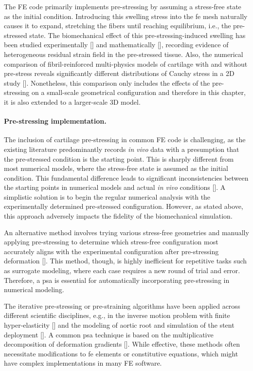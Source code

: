 The FE code primarily implements pre-stressing by assuming a stress-free state as the initial condition. Introducing this swelling stress into the \ac{fe} mesh naturally causes it to expand, stretching the fibers until reaching equilibrium, i.e., the pre-stressed state. The biomechanical effect of this pre-stressing-induced swelling has been studied experimentally [\cite{narmoneva1999}] and mathematically [\cite{setton1996}], recording evidence of heterogeneous residual strain field in the pre-stressed tissue. Also, the numerical comparison of fibril-reinforced multi-physics models of cartilage with and without pre-stress reveals significantly different distributions of Cauchy stress in a 2D study [\cite{wang2018}]. Nonetheless, this comparison only includes the effects of the pre-stressing on a small-scale geometrical configuration and therefore in this chapter, it is also extended to a larger-scale 3D model.

\paragraph{Pre-stressing implementation.} The inclusion of cartilage pre-stressing in common FE code is challenging, as the existing literature predominantly records \textit{in vivo} data with a presumption that the pre-stressed condition is the starting point. This is sharply different from most numerical models, where the stress-free state is assumed as the initial condition. This fundamental difference leads to significant inconsistencies between the starting points in numerical models and actual \textit{in vivo} conditions [\cite{wang2018}]. A simplistic solution is to begin the regular numerical analysis with the experimentally determined pre-stressed configuration. However, as stated above, this approach adversely impacts the fidelity of the biomechanical simulation.

An alternative method involves trying various stress-free geometries and manually applying pre-stressing to determine which stress-free configuration most accurately aligns with the experimental configuration after pre-stressing deformation [\cite{sajjadinia2019,stender2016}]. This method, though, is highly inefficient for repetitive tasks such as surrogate modeling, where each case requires a new round of trial and error. Therefore, a \ac{psa} is essential for automatically incorporating pre-stressing in numerical modeling.

The iterative pre-stressing or pre-straining algorithms have been applied across different scientific disciplines, e.g., in the inverse motion problem with finite hyper-elasticity [\cite{govindjee1996}] and the modeling of aortic root and simulation of the stent deployment [\cite{caimi2020,votta2017}]. A common \ac{psa} technique is based on the multiplicative decomposition of deformation gradients [\cite{gee2010,weisbecker2014,pierce2015,zahn2016}]. While effective, these methods often necessitate modifications to \ac{fe} elements or constitutive equations, which might have complex implementations in many FE software.

